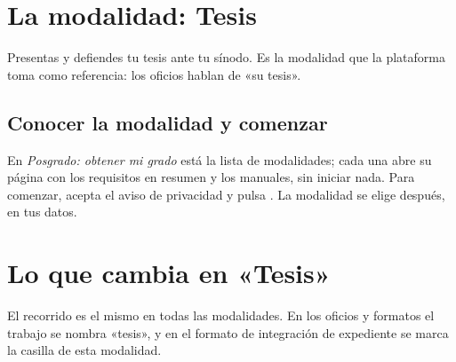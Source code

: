 \section{La modalidad: Tesis}
Presentas y defiendes tu tesis ante tu sínodo. Es la modalidad que la plataforma toma como referencia: los oficios hablan de «su tesis».

\subsection{Conocer la modalidad y comenzar}
En \emph{Posgrado: obtener mi grado} está la lista de modalidades; cada una abre su página con los requisitos en resumen y los manuales, sin iniciar nada. Para comenzar, acepta el aviso de privacidad y pulsa . La modalidad se elige después, en tus datos.
\section{Lo que cambia en «Tesis»}
El recorrido es el mismo en todas las modalidades. En los oficios y formatos el trabajo se nombra «tesis», y en el formato de integración de expediente se marca la casilla de esta modalidad.
